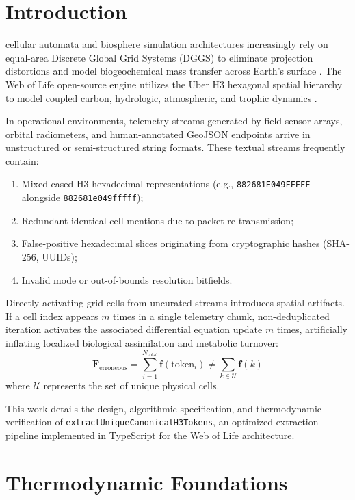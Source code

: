 \documentclass[10pt,journal,compsoc]{IEEEtran}
\begin{document}
\section{Introduction}
 cellular automata and biosphere simulation architectures increasingly rely on equal-area Discrete Global Grid Systems (DGGS) to eliminate projection distortions and model biogeochemical mass transfer across Earth's surface \cite{sahr2003geodesic}. The Web of Life open-source engine utilizes the Uber H3 hexagonal spatial hierarchy to model coupled carbon, hydrologic, atmospheric, and trophic dynamics \cite{brodsky2018h3}.

In operational environments, telemetry streams generated by field sensor arrays, orbital radiometers, and human-annotated GeoJSON endpoints arrive in unstructured or semi-structured string formats. These textual streams frequently contain:
\begin{enumerate}
    \item Mixed-cased H3 hexadecimal representations (e.g., \texttt{882681E049FFFFF} alongside \texttt{882681e049fffff});
    \item Redundant identical cell mentions due to packet re-transmission;
    \item False-positive hexadecimal slices originating from cryptographic hashes (SHA-256, UUIDs);
    \item Invalid mode or out-of-bounds resolution bitfields.
\end{enumerate}

Directly activating grid cells from uncurated streams introduces spatial artifacts. If a cell index appears $m$ times in a single telemetry chunk, non-deduplicated iteration activates the associated differential equation update $m$ times, artificially inflating localized biological assimilation and metabolic turnover:
\begin{equation}
    \mathbf{F}_{\text{erroneous}} = \sum_{i=1}^{N_{\text{total}}} \mathbf{f}(\text{token}_i) \ne \sum_{k \in \mathcal{U}} \mathbf{f}(k)
\end{equation}
where $\mathcal{U}$ represents the set of unique physical cells.

This work details the design, algorithmic specification, and thermodynamic verification of \texttt{extractUniqueCanonicalH3Tokens}, an optimized extraction pipeline implemented in TypeScript for the Web of Life architecture.

\section{Thermodynamic Foundations}
\end{document}
